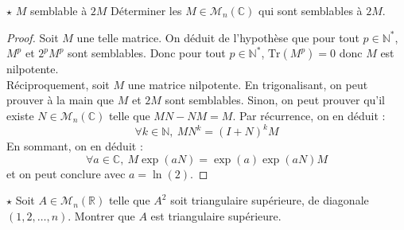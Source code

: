\documentclass[french,a4paper]{article}
\newcommand{\N}{\mathbb{N}}
\newcommand{\R}{\mathbb{R}}
\newcommand{\C}{\mathbb{C}}
\newcommand{\st}{^*}
\newcommand{\Tr}{\text{Tr}}
\theoremstyle{plain}
\theoremstyle{definition}
\theoremstyle{remark}
\begin{document}
\begin{ex}[Châteaux]{$\star$ $M$ semblable à $2M$}
	Déterminer les $M\in\mathcal{M}_n(\C)$ qui sont semblables à $2M$.
\end{ex}
\begin{proof}
	Soit $M$ une telle matrice. On déduit de l'hypothèse que pour tout $p\in\N\st$, $M^p$ et $2^pM^p$ sont semblables. Donc pour tout $p\in\N\st$, $\Tr(M^p)=0$ donc $M$ est nilpotente. \\ Réciproquement, soit $M$ une matrice nilpotente. En trigonalisant, on peut prouver à la main que $M$ et $2M$ sont semblables. Sinon, on peut prouver qu'il existe $N\in\mathcal{M}_n(\C)$ telle que $MN-NM=M$. Par récurrence, on en déduit : $$\forall k\in\N,\ MN^k=(I+N)^kM$$ En sommant, on en déduit : $$\forall a\in\C,\ M\exp(aN)=\exp(a)\exp(aN)M$$ et on peut conclure avec $a=\ln(2)$.
\end{proof}

\begin{ex}[Châteaux]{$\star$}
	Soit $A\in\mathcal{M}_n(\R)$ telle que $A^2$ soit triangulaire supérieure, de diagonale $(1,2,\ldots,n)$. Montrer que $A$ est triangulaire supérieure.
\end{ex}
\end{document}
